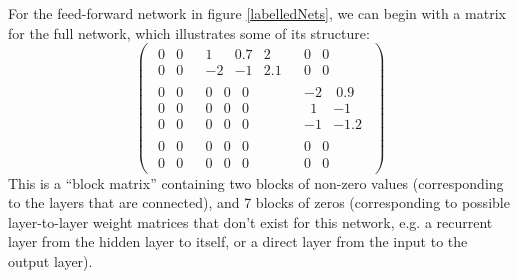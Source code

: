 For the feed-forward network in figure \ref{labelledNets}, we can begin with a matrix for the full network, which illustrates some of its structure:
\begin{equation*}
   \left( 
   \begin{array} {c|c|c}
   \begin{matrix} 0 & 0  \\ 0 & 0 \end{matrix} &
   \begin{matrix} 1 & 0.7 & 2 \\ -2 & -1 & 2.1 \end{matrix} &
   \begin{matrix} 0 & 0  \\ 0 & 0 \end{matrix} \\
   \hline
   \begin{matrix} 0 & 0  \\  0 & 0  \\  0 & 0   \end{matrix} &
   \begin{matrix} 0 & 0 & 0  \\ 0 & 0 & 0 \\ 0 & 0 & 0  \end{matrix} &
   \begin{matrix} -2 & ~0.9  \\  ~~1 & -1  \\  -1 & -1.2  \end{matrix} \\
   \hline
   \begin{matrix} 0 & 0  \\ 0 & 0 \end{matrix} &
   \begin{matrix} 0 & 0 & 0  \\ 0 & 0 & 0 \end{matrix} &
   \begin{matrix} 0 & 0  \\ 0 & 0 \end{matrix}
   \end{array}
   \right)
\end{equation*}
This is a ``block matrix'' containing two blocks of non-zero values (corresponding to the layers that are connected), and 7 blocks of zeros (corresponding to possible layer-to-layer weight matrices that don't exist for this network, e.g. a recurrent layer from the hidden layer to itself, or a direct layer from the input to the output  layer). 

